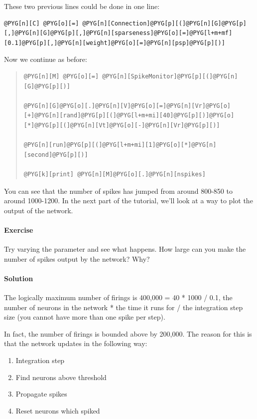 \documentclass[letterpaper,10pt,english]{manual}
\begin{document}
These two previous lines could be done in one line:

\begin{Verbatim}[commandchars=@\[\]]
@PYG[n][C] @PYG[o][=] @PYG[n][Connection]@PYG[p][(]@PYG[n][G]@PYG[p][,]@PYG[n][G]@PYG[p][,]@PYG[n][sparseness]@PYG[o][=]@PYG[l+m+mf][0.1]@PYG[p][,]@PYG[n][weight]@PYG[o][=]@PYG[n][psp]@PYG[p][)]
\end{Verbatim}

Now we continue as before:
\begin{quote}

\begin{Verbatim}[commandchars=@\[\]]
@PYG[n][M] @PYG[o][=] @PYG[n][SpikeMonitor]@PYG[p][(]@PYG[n][G]@PYG[p][)]

@PYG[n][G]@PYG[o][.]@PYG[n][V]@PYG[o][=]@PYG[n][Vr]@PYG[o][+]@PYG[n][rand]@PYG[p][(]@PYG[l+m+mi][40]@PYG[p][)]@PYG[o][*]@PYG[p][(]@PYG[n][Vt]@PYG[o][-]@PYG[n][Vr]@PYG[p][)]

@PYG[n][run]@PYG[p][(]@PYG[l+m+mi][1]@PYG[o][*]@PYG[n][second]@PYG[p][)]

@PYG[k][print] @PYG[n][M]@PYG[o][.]@PYG[n][nspikes]
\end{Verbatim}
\end{quote}

You can see that the number of spikes has jumped from around
800-850 to around 1000-1200. In the next part of the tutorial,
we'll look at a way to plot the output of the network.


\paragraph{Exercise}

Try varying the parameter  and see what happens. How large
can you make the number of spikes output by the network? Why?


\paragraph{Solution}

The logically maximum number of firings is
400,000 = 40 * 1000 / 0.1, the number of neurons in the
network * the time it runs for / the integration step size (you
cannot have more than one spike per step).

In fact, the number of firings is bounded above by 200,000. The
reason for this is that the network updates in the following way:
\begin{enumerate}
\item {} 
Integration step

\item {} 
Find neurons above threshold

\item {} 
Propagate spikes

\item {} 
Reset neurons which spiked

\end{enumerate}
\end{document}

